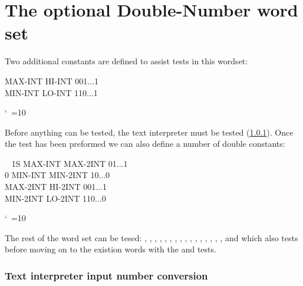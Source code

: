 

\section{The optional Double-Number word set} %

Two additional constants are defined to assist tests in this wordset:

\begin{tt}\frenchspacing\obeyspaces
MAX-INT    HI-INT    001...1 \\
MIN-INT    LO-INT    110...1
\end{tt}
\nonfrenchspacing\catcode`\ =10

Before anything can be tested, the text interpreter must be
tested (\ref{test:dbl:in}).
Once the  test has been preformed
we can also define a number of double constants:

\begin{tt}\frenchspacing\obeyspaces
~     1S MAX-INT  MAX-2INT    01...1 \\\mbox{}
      0 MIN-INT  MIN-2INT    10...0 \\
MAX-2INT        HI-2INT     001...1 \\
MIN-2INT        LO-2INT     110...0
\end{tt}
\nonfrenchspacing\catcode`\ =10

The rest of the word set can be tesed:
,
, ,
, ,
, ,
, ,
, ,
, ,
, ,
,  and
 which also tests  before moving on
to the existion words with the
 and  tests.

\setcounter{subsection}{3}
\setcounter{subsubsection}{1}
\subsubsection{Text interpreter input number conversion}
\label{test:dbl:in}

